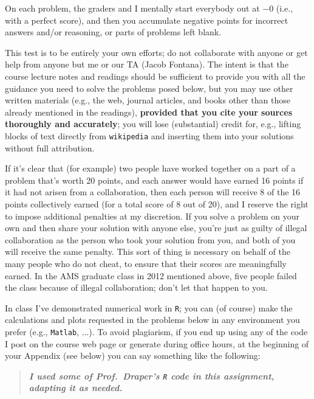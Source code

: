 \documentclass[12pt]{article}
\newcommand{\bi}[1]{\textbf{\textit{#1}}}
\begin{document}
On each problem, the graders and I mentally start everybody out at $-0$ (i.e., with a perfect score), and then you accumulate negative points for incorrect answers and/or reasoning, or parts of problems left blank.

This test is to be entirely your own efforts; do not collaborate with
anyone or get help from anyone but me or our TA (Jacob Fontana). The intent is that the course lecture notes and readings should be sufficient to provide you with all the guidance you need to solve the problems posed below, but you may use other written materials (e.g., the web, journal articles, and books other than those already mentioned in the readings),
\textbf{provided that you cite your sources thoroughly and accurately}; you
will lose (substantial) credit for, e.g., lifting blocks of text directly
from \texttt{wikipedia} and inserting them into your solutions without full
attribution.

If it's clear that (for example) two people have worked together on a part
of a problem that's worth 20 points, and each answer would have earned 16
points if it had not arisen from a collaboration, then each person will
receive 8 of the 16 points collectively earned (for a total score of 8 out
of 20), and I reserve the right to impose additional penalties at my
discretion. If you solve a problem on your own and then share your solution
with anyone else, you're just as guilty of illegal collaboration as
the person who took your solution from you, and both of you will receive
the same penalty. This sort of thing is necessary on behalf of the many
people who do not cheat, to ensure that their scores are meaningfully
earned. In the AMS graduate class in 2012 mentioned above, five people failed the class because of illegal collaboration; don't let that happen to you.

In class I've demonstrated numerical work in \texttt{R}; you can (of course) make the calculations and plots requested in the problems below in any environment you prefer (e.g., \texttt{Matlab}, ...). To avoid plagiarism, if you end up using any of the code I post on the course web page or generate during office hours, at the beginning of your Appendix (see below) you can say something like the following: \vspace*{-0.1in} 

\begin{quote}

\bi{I used some of Prof.~Draper's \texttt{R} code in this assignment, adapting it as needed.} \vspace*{-0.25in} 

\end{quote}
\end{document}
